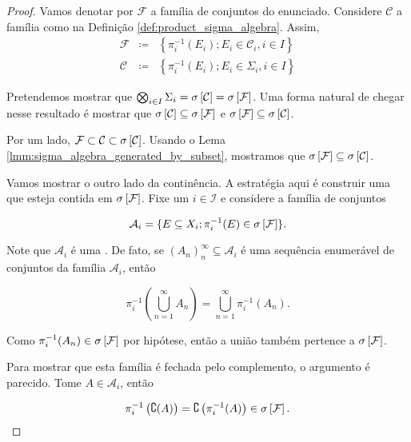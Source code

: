 \begin{proof}
    Vamos denotar por $\mathcal{F}$ a família de conjuntos do enunciado. Considere $\mathcal{C}$ a família como na Definição \ref{def:product_sigma_algebra}. Assim,
    \begin{eqnarray*}
        \mathcal{F} &\coloneq& \left\{\pi_i^{-1}(E_i); E_i\in \mathcal{C}_i, i\in I\right\}\\
        \mathcal{C} &\coloneq& \left\{\pi_i^{-1}(E_i); E_i\in \Sigma_i, i\in I\right\}
    \end{eqnarray*}
    
    Pretendemos mostrar que  $\bigotimes_{i\in I} \Sigma_i=\sigma \left[\mathcal{C}\right]=\sigma \left[\mathcal{F}\right]$. Uma forma natural de chegar nesse resultado é mostrar que $\sigma \left[\mathcal{C}\right]\subseteq\sigma \left[\mathcal{F}\right]$ e $\sigma \left[\mathcal{F}\right]\subseteq\sigma \left[\mathcal{C}\right]$.
    
    Por um lado, $\mathcal{F}\subset \mathcal{C} \subset \sigma \left[\mathcal{C}\right]$. Usando o Lema \ref{lmm:sigma_algebra_generated_by_subset}, mostramos que $\sigma \left[\mathcal{F}\right]\subseteq\sigma \left[\mathcal{C}\right]$.
    
    Vamos mostrar o outro lado da continência. A estratégia aqui é construir uma \sigmaAlg que esteja contida em $\sigma \left[\mathcal{F}\right]$. Fixe um $i\in\mathcal{I}$ e considere a família de conjuntos 

    \begin{equation*}
        \mathcal{A}_i=\{E\subseteq X_i; \pi_{i}^{-1}(E)\in \sigma \left[\mathcal{F}\right]\}.
    \end{equation*}

    Note que $\mathcal{A}_i$ é uma \sigmaAlg. De fato, se $(A_n)_{n}^{\infty}\subseteq \mathcal{A}_i$ é uma sequência enumerável de conjuntos da família $\mathcal{A}_i$, então
    
    \begin{equation*}
        \pi_{i}^{-1}\left(\bigcup_{n=1}^{\infty} A_n\right) = \bigcup_{n=1}^{\infty} \pi_{i}^{-1}(A_n).
    \end{equation*}

    Como $\pi_{i}^{-1}(A_n)\in\sigma \left[\mathcal{F}\right]$ por hipótese, então a união também pertence a $\sigma \left[\mathcal{F}\right]$.

    Para mostrar que esta família é fechada pelo complemento, o argumento é parecido. Tome $A\in\mathcal{A}_i$, então

    \begin{equation*}
        \pi_{i}^{-1}\left(\complement(A)\right) = \complement\left(\pi_{i}^{-1}(A)\right)\in\sigma \left[\mathcal{F}\right].
    \end{equation*}


\end{proof}
